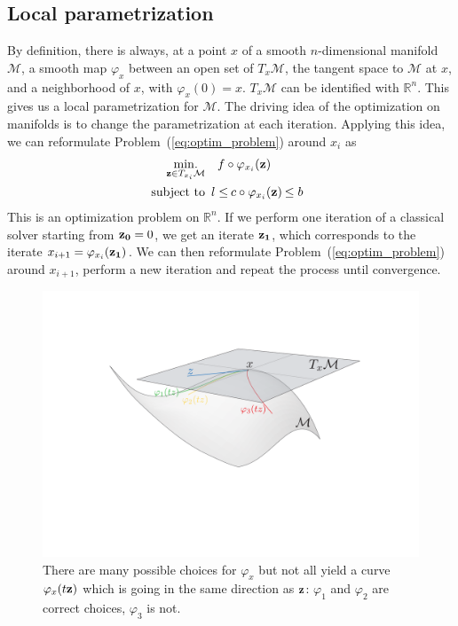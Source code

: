 \subsection{Local parametrization}
By definition, there is always, at a point $x$ of a smooth $n$-dimensional manifold $\mathcal{M}$, a smooth map $\varphi_x$ between an open set of $T_x\mathcal{M}$, the tangent space to $\mathcal{M}$ at $x$, and a neighborhood of $x$, with $\varphi_x(0) = x$. $T_x\mathcal{M}$ can be identified with $\mathbb{R}^n$. This gives us a local parametrization for $\mathcal{M}$. The driving idea of the optimization on manifolds is to change the parametrization at each iteration. Applying this idea, we can reformulate Problem~(\ref{eq:optim_problem}) around $x_i$ as
\begin{align}
\label{eq:local_problem}
\minimize_{{\bf z} \in T_{x_i}\mathcal{M}} & \quad f \circ \varphi_{x_i}({\bf z}) \\
  \text{subject to}&
  \begin{array}{rcl}
    {l} \leq & \reduce{c \circ \varphi_{x_i}({\bf z})}{8}& \leq {b} \nonumber
  \end{array}
\end{align}
This is an optimization problem on $\mathbb{R}^n$. If we perform one iteration of a classical solver starting from ${\bf z_0} = 0$, we get an iterate ${\bf z_1}$, which corresponds to the iterate $x_{i+1} = \varphi_{x_i}({\bf z_1})$. We can then reformulate Problem~(\ref{eq:optim_problem}) around $x_{i+1}$, perform a new iteration and repeat the process until convergence.

\begin{figure}[!htb]
	\centering
  \includegraphics[width=.9\linewidth]{papers/Humanoids2015/figure/manifold.pdf}
    \caption{There are many possible choices for $\varphi_{x}$ but not all yield a curve $\varphi_{x}(t{\bf z})$ which is going in the same direction as ${\bf z}$: $\varphi_{1}$ and $\varphi_{2}$ are correct choices, $\varphi_{3}$ is not.}
	\label{fig:phimap}
\end{figure}


